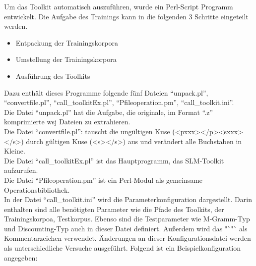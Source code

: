 
Um das Toolkit automatisch auszuf\"uhren, wurde ein Perl-Script Programm entwickelt. Die Aufgabe des Trainings kann in die folgenden  3 Schritte eingeteilt werden.
\begin{itemize}
	\item Entpackung der Trainingskorpora
	\item Umstellung der Trainingskorpora
	\item Ausf\"uhrung des Toolkits
\end{itemize}
Dazu enth\"alt dieses Programme folgende f\"unf Dateien "`unpack.pl"', "`convertfile.pl"', "`call\_toolkitEx.pl"', "`Pfileoperation.pm"',  "`call\_toolkit.ini"'.\\
Die Datei "`unpack.pl"' hat die Aufgabe, die originale, im Format "`.z"' komprimierte  wsj Dateien zu extrahieren.\\
Die Datei "`convertfile.pl"': tauscht die ung\"ultigen Kuse (<pxxx></p><sxxx></s>) durch g\"ultigen Kuse (<s></s>) aus und ver\"andert alle Buchstaben in Kleine. \\
Die Datei "`call\_toolkitEx.pl"' ist das Hauptprogramm, das SLM-Toolkit aufzurufen.\\ 
Die Datei "`Pfileoperation.pm"' ist ein Perl-Modul\cite{book_perl} als gemeinsame Operationsbibliothek.\\
In der Datei "`call\_toolkit.ini"'  wird die Parameterkonfiguration dargestellt. Darin enthalten sind alle ben\"otigten Parameter wie die Pfade des Toolkits, der Trainingskorpoa, Testkorpus. Ebenso sind die Testparameter wie M-Gramm-Typ und Discounting-Typ auch in dieser Datei definiert. Au\ss erdem wird das "`\text{\#}"`  als Kommentarzeichen verwendet. \"Anderungen an dieser Konfigurationsdatei werden als unterschiedliche Versuche ausgef\"uhrt. Folgend ist ein Beispielkonfiguration angegeben:


